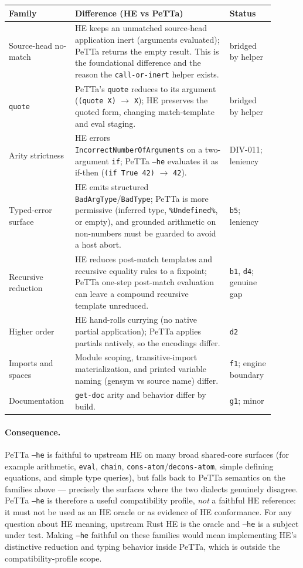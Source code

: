 \documentclass[11pt]{article}
\newcommand{\code}[1]{\texttt{#1}}
\newcommand{\HE}{\textup{HE}}
\newcommand{\PeTTa}{\textup{PeTTa}}
\begin{document}
\begin{longtable}{>{\raggedright\arraybackslash}p{0.19\linewidth}
                  >{\raggedright\arraybackslash}p{0.55\linewidth}
                  >{\raggedright\arraybackslash}p{0.16\linewidth}}
\toprule
Family & Difference (\HE{} vs \PeTTa{}) & Status \\
\midrule
\endhead
Source-head no-match & \HE{} keeps an unmatched source-head application inert
(arguments evaluated); \PeTTa{} returns the empty result.  This is the
foundational difference and the reason the \code{call-or-inert} helper exists. &
bridged by helper \\
\code{quote} & \PeTTa{}'s \code{quote} reduces to its argument
(\code{(quote X)} $\to$ \code{X}); \HE{} preserves the quoted form, changing
match-template and eval staging. & bridged by helper \\
Arity strictness & \HE{} errors \code{IncorrectNumberOfArguments} on a
two-argument \code{if}; \PeTTa{} \code{--he} evaluates it as if-then
(\code{(if True 42)} $\to$ \code{42}). & DIV-011; leniency \\
Typed-error surface & \HE{} emits structured \code{BadArgType}/\code{BadType};
\PeTTa{} is more permissive (inferred type, \code{\%Undefined\%}, or empty), and
grounded arithmetic on non-numbers must be guarded to avoid a host abort. &
\code{b5}; leniency \\
Recursive reduction & \HE{} reduces post-match templates and recursive equality
rules to a fixpoint; \PeTTa{} one-step post-match evaluation can leave a compound
recursive template unreduced. & \code{b1}, \code{d4}; genuine gap \\
Higher order & \HE{} hand-rolls currying (no native partial application);
\PeTTa{} applies partials natively, so the encodings differ. & \code{d2} \\
Imports and spaces & Module scoping, transitive-import materialization, and
printed variable naming (gensym vs source name) differ. & \code{f1}; engine
boundary \\
Documentation & \code{get-doc} arity and behavior differ by build. & \code{g1};
minor \\
\bottomrule
\end{longtable}

\paragraph{Consequence.}
\PeTTa{} \code{--he} is faithful to upstream \HE{} on many broad shared-core
surfaces (for example arithmetic, \code{eval}, \code{chain},
\code{cons-atom}/\code{decons-atom}, simple defining equations, and simple type
queries), but falls back to \PeTTa{} semantics on the families above ---
precisely the surfaces where the two dialects genuinely disagree.  \PeTTa{}
\code{--he} is
therefore a useful compatibility profile, \emph{not} a faithful \HE{} reference:
it must not be used as an \HE{} oracle or as evidence of \HE{} conformance.  For
any question about \HE{} meaning, upstream Rust \HE{} is the oracle and
\code{--he} is a subject under test.  Making \code{--he} faithful on these
families would mean implementing \HE{}'s distinctive reduction and typing
behavior inside \PeTTa{}, which is outside the compatibility-profile scope.
\end{document}
